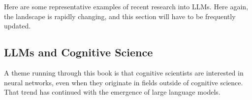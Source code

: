 Here are some representative examples of recent research into LLMs. Here again, the landscape is rapidly changing, and this section will have to be frequently updated.

\subsection{LLMs and Cognitive Science}\label{llm_cogsci}



A theme running through this book is that cognitive scientists are interested in neural networks, even when they originate in fields outside of cognitive science. That trend has continued with the emergence of large language models.

